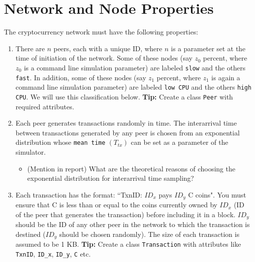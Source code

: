 \documentclass[12pt]{extarticle}
\begin{document}
\section*{Network and Node Properties}
The cryptocurrency network must have the following properties:
\begin{enumerate}
    \item There are $n$ peers, each with a unique ID, where $n$ is a parameter set at the time of initiation of the network. Some of these nodes (say $z_0$ percent, where $z_0$ is a command line simulation parameter) are labeled \texttt{slow} and the others \texttt{fast}. In addition, some of these nodes (say $z_1$ percent, where $z_1$ is again a command line simulation parameter) are labeled \texttt{low CPU} and the others \texttt{high CPU}. We will use this classification below. \textbf{Tip:} Create a class \texttt{Peer} with required attributes.

    \item Each peer generates transactions randomly in time. The interarrival time between transactions generated by any peer is chosen from an exponential distribution whose \texttt{mean time} $(T_{tx})$ can be set as a parameter of the simulator.
          \begin{itemize}
              \item (Mention in report) What are the theoretical reasons of choosing the exponential distribution for interarrival time sampling?
          \end{itemize}
    \item Each transaction has the format: ``TxnID: $ID_x$ pays $ID_y$ C coins". You must ensure that C is less than or equal to the coins currently owned by $ID_x$ (ID of the peer that generates the transaction) before including it in a block. $ID_y$ should be the ID of any other peer in the network to which the transaction is destined ($ID_y$ should be chosen randomly). The size of each transaction is assumed to be 1 KB. \textbf{Tip:} Create a class \texttt{Transaction} with attributes like \texttt{TxnID}, \texttt{ID\_x}, \texttt{ID\_y}, \texttt{C} etc.


\end{enumerate}
\end{document}
